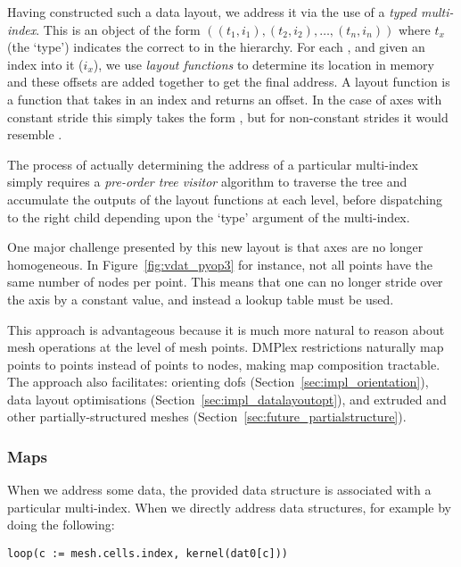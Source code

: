 Having constructed such a data layout, we address it via the use of a \textit{typed multi-index}.
This is an object of the form $((t_1, i_1), (t_2, i_2), \dots, (t_n, i_n))$ where $t_x$ (the `type') indicates the correct  to in the hierarchy.
For each , and given an index into it ($i_x$), we use \textit{layout functions} to determine its location in memory and these offsets are added together to get the final address.
A layout function is a function that takes in an index and returns an offset.
In the case of axes with constant stride this simply takes the form , but for non-constant strides it would resemble .

The process of actually determining the address of a particular multi-index simply requires a \textit{pre-order tree visitor} algorithm to traverse the tree and accumulate the outputs of the layout functions at each level, before dispatching to the right child depending upon the `type' argument of the multi-index.

One major challenge presented by this new layout is that axes are no longer homogeneous.
In Figure~\ref{fig:vdat_pyop3} for instance, not all points have the same number of nodes per point.
This means that one can no longer stride over the axis by a constant value, and instead a lookup table must be used.

This approach is advantageous because it is much more natural to reason about mesh operations at the level of mesh points.
DMPlex restrictions naturally map points to points instead of points to nodes, making map composition tractable.
The approach also facilitates: orienting \glspl{dof} (Section~\ref{sec:impl_orientation}), data layout optimisations (Section~\ref{sec:impl_datalayoutopt}), and extruded and other partially-structured meshes (Section~\ref{sec:future_partialstructure}).


\subsubsection{Maps}

When we address some data, the provided data structure is associated with a particular multi-index.
When we directly address data structures, for example by doing the following:

\begin{verbatim}
loop(c := mesh.cells.index, kernel(dat0[c]))
\end{verbatim}

